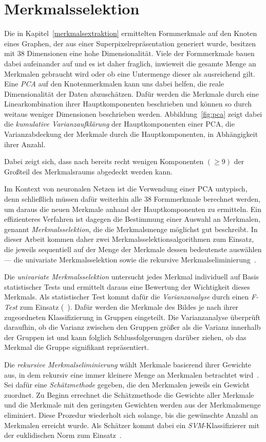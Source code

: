 \section{Merkmalsselektion}
\label{merkmalsselektion}

Die in Kapitel~\ref{merkmalsextraktion} ermittelten Formmerkmale auf den Knoten eines Graphen, der aus einer Superpixelrepräsentation generiert wurde, besitzen mit $38$ Dimensionen eine hohe Dimensionalität.
Viele der Formmerkmale bauen dabei aufeinander auf und es ist daher fraglich, inwieweit die gesamte Menge an Merkmalen gebraucht wird oder ob eine Untermenge dieser als ausreichend gilt.
Eine \emph{\gls{PCA}} auf den Knotenmerkmalen kann uns dabei helfen, die reale Dimensionalität der Daten abzuschätzen.
Dafür werden die Merkmale durch eine Linearkombination ihrer Hauptkomponenten beschrieben und können so durch weitaus weniger Dimensionen beschrieben werden.
Abbildung~\ref{fig:pca} zeigt dabei die \emph{kumulative Varianzaufklärung} der Hauptkomponenten einer \gls{PCA}, \dhe{} die Varianzabdeckung der Merkmale durch die Hauptkomponenten, in Abhängigkeit ihrer Anzahl.

Dabei zeigt sich, dass nach bereits recht wenigen Komponenten $\left(\geq 9\right)$ der Großteil des Merkmalsraums abgedeckt werden kann.

Im Kontext von neuronalen Netzen ist die Verwendung einer \gls{PCA} untypisch, denn schließlich müssen dafür weiterhin alle $38$ Formmerkmale berechnet werden, um daraus die neuen Merkmale anhand der Hauptkomponenten zu ermitteln.
Ein effizienteres Verfahren ist dagegen die Bestimmung einer Auswahl an Merkmalen, genannt \emph{Merkmalsselektion}, die die Merkmalsmenge möglichst gut beschreibt.
In dieser Arbeit kommen daher zwei Merkmalsselektionsalgorithmen zum Einsatz, die jeweils sequentiell auf der Menge der Merkmale dessen bedeutenste auswählen — die univariate Merkmalsselektion sowie die rekursive Merkmalseliminierung~\cite{scikitlearn}.

Die \emph{univariate Merkmalsselektion} untersucht jedes Merkmal individuell auf Basis statistischer Tests und ermittelt daraus eine Bewertung der Wichtigkeit dieses Merkmals.
Als statistischer Test kommt dafür die \emph{Varianzanalyse} durch einen \emph{F-Test} zum Einsatz (\vgl{}~\cite{scikitlearn}).
Dafür werden die Merkmale des Bildes je nach ihrer zugeordneten Klassifizierung in Gruppen eingeteilt.
Die Varianzanalyse überprüft daraufhin, ob die Varianz zwischen den Gruppen größer als die Varianz innerhalb der Gruppen ist und kann folglich Schlussfolgerungen darüber ziehen, ob das Merkmal die Gruppe signifikant repräsentiert.

Die \emph{rekursive Merkmalseliminierung} wählt Merkmale basierend ihrer Gewichte aus, in dem rekursiv eine immer kleinere Menge an Merkmalen betrachtet wird~\cite{scikitlearn}.
Sei dafür eine \emph{Schätzmethode} gegeben, die den Merkmalen jeweils ein Gewicht zuordnet.
Zu Beginn errechnet die Schätzmethode die Gewichte aller Merkmale und die Merkmale mit den geringsten Gewichten werden aus der Merkmalsmenge eliminiert.
Diese Prozedur wiederholt sich solange, bis die gewünschte Anzahl an Merkmalen erreicht wurde.
Als Schätzer kommt dabei ein \emph{\gls{SVM}}-Klassifizierer mit der euklidischen Norm zum Einsatz~\cite{scikitlearn}.
